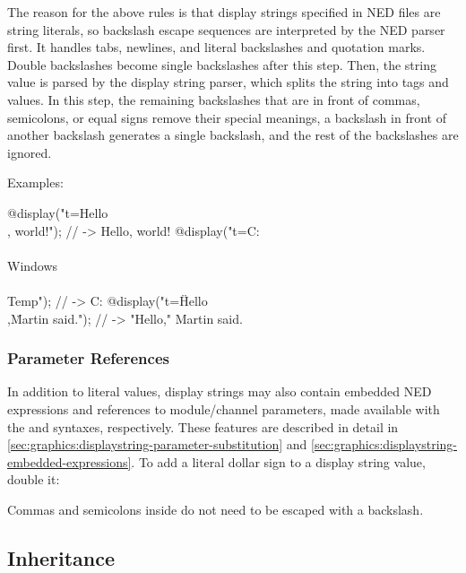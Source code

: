 The reason for the above rules is that display strings specified in NED files
are string literals, so backslash escape sequences are interpreted by the NED
parser first. It handles tabs, newlines, and literal backslashes and quotation
marks. Double backslashes become single backslashes after this step. Then, the
string value is parsed by the display string parser, which splits the string
into tags and values. In this step, the remaining backslashes that are in front
of commas, semicolons, or equal signs remove their special meanings, a backslash
in front of another backslash generates a single backslash, and the rest of the
backslashes are ignored.

Examples:

\begin{ned}
  @display("t=Hello\\, world!");  // -> Hello, world!
  @display("t=C:\\\\Windows\\\\Temp"); // -> C:\Windows\Temp
  @display("t=\"Hello\\,\" Martin said."); // -> "Hello," Martin said.
\end{ned}

\subsubsection{Parameter References}
\label{sec:graphics:dispstr-paramrefs}

In addition to literal values, display strings may also contain embedded
NED expressions and references to module/channel parameters, made available
with the  and  syntaxes, respectively. These features
are described in detail in \ref{sec:graphics:displaystring-parameter-substitution}
and \ref{sec:graphics:displaystring-embedded-expressions}.
To add a literal dollar sign to a display string value, double it:


Commas and semicolons inside  do not need to be escaped with a backslash.

\subsection{Inheritance}
\label{sec:graphics:displaystring-inheritance}


